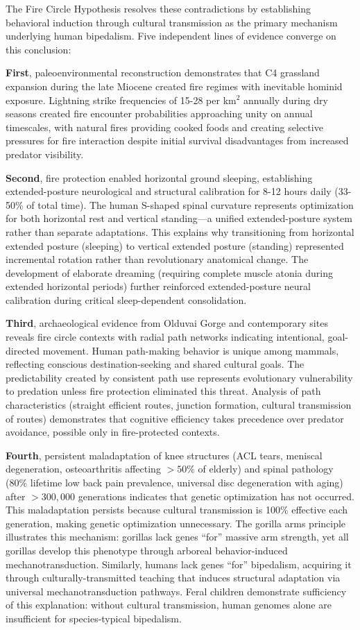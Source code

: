 \documentclass[12pt,a4paper]{article}
\begin{document}
The Fire Circle Hypothesis resolves these contradictions by establishing behavioral induction through cultural transmission as the primary mechanism underlying human bipedalism. Five independent lines of evidence converge on this conclusion:

\textbf{First}, paleoenvironmental reconstruction demonstrates that C4 grassland expansion during the late Miocene created fire regimes with inevitable hominid exposure. Lightning strike frequencies of 15-28 per km$^2$ annually during dry seasons created fire encounter probabilities approaching unity on annual timescales, with natural fires providing cooked foods and creating selective pressures for fire interaction despite initial survival disadvantages from increased predator visibility.

\textbf{Second}, fire protection enabled horizontal ground sleeping, establishing extended-posture neurological and structural calibration for 8-12 hours daily (33-50\% of total time). The human S-shaped spinal curvature represents optimization for both horizontal rest and vertical standing—a unified extended-posture system rather than separate adaptations. This explains why transitioning from horizontal extended posture (sleeping) to vertical extended posture (standing) represented incremental rotation rather than revolutionary anatomical change. The development of elaborate dreaming (requiring complete muscle atonia during extended horizontal periods) further reinforced extended-posture neural calibration during critical sleep-dependent consolidation.

\textbf{Third}, archaeological evidence from Olduvai Gorge and contemporary sites reveals fire circle contexts with radial path networks indicating intentional, goal-directed movement. Human path-making behavior is unique among mammals, reflecting conscious destination-seeking and shared cultural goals. The predictability created by consistent path use represents evolutionary vulnerability to predation unless fire protection eliminated this threat. Analysis of path characteristics (straight efficient routes, junction formation, cultural transmission of routes) demonstrates that cognitive efficiency takes precedence over predator avoidance, possible only in fire-protected contexts.

\textbf{Fourth}, persistent maladaptation of knee structures (ACL tears, meniscal degeneration, osteoarthritis affecting $>50\%$ of elderly) and spinal pathology (80\% lifetime low back pain prevalence, universal disc degeneration with aging) after $>300,000$ generations indicates that genetic optimization has not occurred. This maladaptation persists because cultural transmission is 100\% effective each generation, making genetic optimization unnecessary. The gorilla arms principle illustrates this mechanism: gorillas lack genes ``for'' massive arm strength, yet all gorillas develop this phenotype through arboreal behavior-induced mechanotransduction. Similarly, humans lack genes ``for'' bipedalism, acquiring it through culturally-transmitted teaching that induces structural adaptation via universal mechanotransduction pathways. Feral children demonstrate sufficiency of this explanation: without cultural transmission, human genomes alone are insufficient for species-typical bipedalism.
\end{document}
